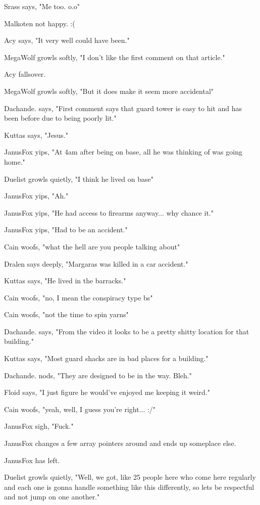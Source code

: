 Srass says, "Me too. o.o"

Malkoten not happy. :(

Acy says, "It very well could have been."

MegaWolf growls softly, "I don't like the first comment on that article."

Acy fallsover.

MegaWolf growls softly, "But it does make it seem more accidental"

Dachande. says, "First comment says that guard tower is easy to hit and has been before due to being poorly lit."

Kuttas says, "Jesus."

JanusFox yips, "At 4am after being on base, all he was thinking of was going home."

Duelist growls quietly, "I think he lived on base"

JanusFox yips, "Ah."

JanusFox yips, "He had access to firearms anyway... why chance it."

JanusFox yips, "Had to be an accident."

Cain woofs, "what the hell are you people talking about"

Dralen says deeply, "Margaras was killed in a car accident."

Kuttas says, "He lived in the barracks."

Cain woofs, "no, I mean the conspiracy type bs"

Cain woofs, "not the time to spin yarns"

Dachande. says, "From the video it looks to be a pretty shitty location for that building."

Kuttas says, "Most guard shacks are in bad places for a building."

Dachande. nods, "They are designed to be in the way. Bleh."

Floid says, "I just figure he would've enjoyed me keeping it weird."

Cain woofs, "yeah, well, I guess you're right... :/"

JanusFox sigh, "Fuck."

JanusFox changes a few array pointers around and ends up someplace else.

JanusFox has left.

Duelist growls quietly, "Well, we got, like 25 people here who come here regularly and each one is gonna handle something like this differently, so lets be respectful and not jump on one another."

